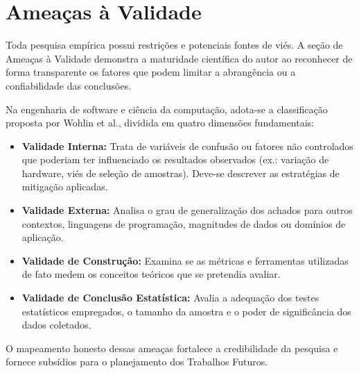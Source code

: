 \chapter{Ameaças à Validade}
\label{chap:ameacas_validade}

Toda pesquisa empírica possui restrições e potenciais fontes de viés. A seção de Ameaças à Validade demonstra a maturidade científica do autor ao reconhecer de forma transparente os fatores que podem limitar a abrangência ou a confiabilidade das conclusões.

Na engenharia de software e ciência da computação, adota-se a classificação proposta por Wohlin et al., dividida em quatro dimensões fundamentais:

\begin{itemize}
    \item \textbf{Validade Interna:} Trata de variáveis de confusão ou fatores não controlados que poderiam ter influenciado os resultados observados (ex.: variação de hardware, viés de seleção de amostras). Deve-se descrever as estratégias de mitigação aplicadas.
    \item \textbf{Validade Externa:} Analisa o grau de generalização dos achados para outros contextos, linguagens de programação, magnitudes de dados ou domínios de aplicação.
    \item \textbf{Validade de Construção:} Examina se as métricas e ferramentas utilizadas de fato medem os conceitos teóricos que se pretendia avaliar.
    \item \textbf{Validade de Conclusão Estatística:} Avalia a adequação dos testes estatísticos empregados, o tamanho da amostra e o poder de significância dos dados coletados.
\end{itemize}

O mapeamento honesto dessas ameaças fortalece a credibilidade da pesquisa e fornece subsídios para o planejamento dos Trabalhos Futuros.